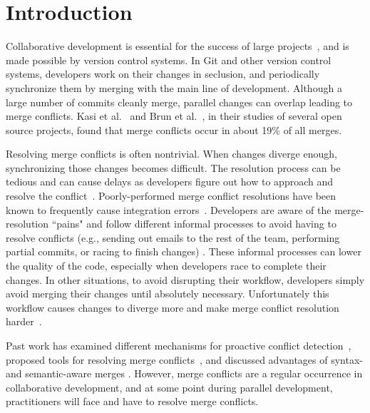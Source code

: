 
\section{Introduction}\label{introduction}


Collaborative development is essential for the success of large projects~\cite{hattori2010syde}, and is made possible by version control systems. 
In Git and other version control systems, developers work on their changes in seclusion, and periodically synchronize them by merging with the main line of development. 
Although a large number of commits cleanly merge, parallel changes can overlap leading to merge conflicts. Kasi et al.~\cite{cassandra} and Brun et al.~\cite{Brun2011}, in their studies of several open source projects, found that merge conflicts occur in about 19\% of all merges.

Resolving merge conflicts is often nontrivial. 
When changes diverge enough, synchronizing those changes becomes difficult. 
The resolution process can be tedious and can cause delays as developers figure out how to approach and resolve the conflict~\cite{cassandra}. 
Poorly-performed merge conflict resolutions have been known to frequently cause integration errors~\cite{bird-branches-conflict}. 
Developers are aware of the merge-resolution ``pains" and follow different informal processes to avoid having to resolve conflicts (e.g., sending out emails to the rest of the team, performing partial commits, or racing to finish changes) \cite{deSouza2003breaking}\cite{cataldo2008distributed_dev}.
These informal processes can lower the quality of the code, especially when developers race to complete their changes. 
In other situations, to avoid disrupting their workflow, developers simply avoid merging their changes until absolutely necessary.
Unfortunately this workflow causes changes to diverge more and make merge conflict resolution harder~\cite{Brun2011}. 


Past work has examined different mechanisms for proactive conflict detection~\cite{Brun2011}\cite{palantir}\cite{Guimaraes}, proposed tools for resolving merge conflicts~\cite{nishimura}\cite{mens2002state}, and discussed advantages of syntax- and semantic-aware merges \cite{danny_refactorings}\cite{hunt2002extensible}. 
However, merge conflicts are a regular occurrence in collaborative development, and at some point during parallel development, practitioners will face and have to resolve merge conflicts.

